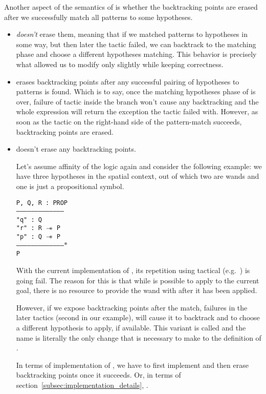 Another aspect of the semantics of  is whether the backtracking points are erased after we successfully match all patterns to some hypotheses.
\begin{itemize}
\item {} \emph{doesn't} erase them, meaning that if we matched patterns to hypotheses in some way, but then later the tactic failed, we can backtrack to the matching phase and choose a different hypotheses matching.
This behavior is precisely what allowed us to modify  only slightly while keeping correctness.
\item {} erases backtracking points after any successful pairing of hypotheses to patterns is found.
  Which is to say, once the matching hypotheses phase of  is over, failure of tactic inside the branch won't cause any backtracking and the whole expression will return the exception the tactic failed with.
  However, as soon as the tactic on the right-hand side of the pattern-match succeeds, backtracking points are erased.
\item {} doesn't erase any backtracking points.

  Let's assume affinity of the logic again and consider the following example:
  we have three hypotheses in the spatial context, out of which two are wands and one is just a propositional symbol.

\begin{minipage}{1.0\linewidth}
\texttt{P, Q, R : PROP\\
---------------------------------------\\
"q" : Q\\
"r" : R $\mathrel{-\mkern-6mu*}$ P\\
"p" : Q $\mathrel{-\mkern-6mu*}$ P\\
--------------------------------------$\ast$\\
P}
\end{minipage}

With the current implementation of , its repetition using  tactical (e.g.\ ) is going fail.
The reason for this is that while  is possible to apply to the current goal, there is no resource to provide the wand with after it has been applied.

However, if we expose backtracking points after the match, failures in the later tactics (second  in our example), will cause it to backtrack and
to choose a different hypothesis to apply, if available.
This variant is called  and the name is literally the only change that is necessary to make to the definition of .

In terms of implementation of , we have to first implement  and then erase backtracking points once it succeeds.
Or, in terms of section~\ref{subsec:implementation_details}, .
\end{itemize}

